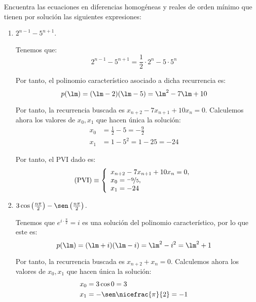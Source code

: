 \begin{ejercicio}
    Encuentra las ecuaciones en diferencias homogéneas y reales de orden mínimo que tienen por solución las siguientes
    expresiones:
    \begin{enumerate}
        \item $2^{n-1} - 5^{n+1}$.

        Tenemos que:
        \begin{equation*}
            2^{n-1} - 5^{n+1} = \frac{1}{2}\cdot 2^n -5\cdot 5^n
        \end{equation*}

        Por tanto, el polinomio característico asociado a dicha recurrencia es:
        \begin{equation*}
            p(\lm) = (\lm-2)(\lm-5) = \lm^2-7\lm +10
        \end{equation*}

        Por tanto, la recurrencia buscada es $x_{n+2}-7x_{n+1}+10x_n=0$. Calculemos ahora los valores de $x_0,x_1$ que hacen única la solución:
        \begin{align*}
            x_0 &= \frac{1}{2} -5 = -\frac{9}{2}\\
            x_1 &= 1-5^2 = 1-25=-24
        \end{align*}

        Por tanto, el PVI dado es:
        \begin{equation*}
            \text{(PVI)}\equiv \left\{ \begin{array}{l}
                x_{n+2}-7x_{n+1}+10x_n=0,\\
                x_0=\nicefrac{-9}{5},\\
                x_1=-24
            \end{array}\right.
        \end{equation*}

        
        \item $3\cos\left(\frac{n\pi}{2}\right) - \sen\left(\frac{n\pi}{2}\right)$.

        Tenemos que $e^{i\cdot \frac{\pi}{2}}=i$ es una solución del polinomio característico, por lo que este es:
        \begin{equation*}
            p(\lm) = (\lm+i)(\lm-i) = \lm^2-i^2 = \lm^2+1
        \end{equation*}

        Por tanto, la recurrencia buscada es $x_{n+2}+x_n=0$. Calculemos ahora los valores de $x_0,x_1$ que hacen única la solución:
        \begin{align*}
            x_0 &= 3\cos 0 = 3\\
            x_1 &= -\sen\nicefrac{\pi}{2} = -1
        \end{align*}


\end{enumerate}
\end{ejercicio}
